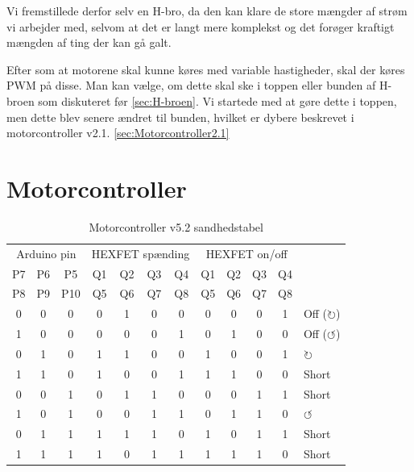 \documentclass[a4paper,oneside,article,danish,table]{memoir}
\begin{document}
Vi fremstillede derfor selv en H-bro, da den kan klare de store mængder af strøm vi arbejder med, selvom at det er langt mere komplekst og det forøger kraftigt mængden af ting der kan gå galt.

Efter som at motorene skal kunne køres med variable hastigheder, skal der køres PWM på disse. Man kan vælge, om dette skal ske i toppen eller bunden af H-broen som diskuteret før \ref{sec:H-broen}. Vi startede med at gøre dette i toppen, men dette blev senere ændret til bunden, hvilket er dybere beskrevet i motorcontroller v2.1. \ref{sec:Motorcontroller2.1}
\section{Motorcontroller}

\begin{table}[htbp]
  \caption{Motorcontroller v5.2 sandhedstabel}
  \centering
  \begin{tabular}{ccc|cccc|ccccl}
    \toprule
    \multicolumn{3}{c}{Arduino pin}&\multicolumn{4}{c}{HEXFET spænding}&\multicolumn{4}{c}{HEXFET on/off}\\
    P7&P6&P5 &Q1&Q2&Q3&Q4 &Q1&Q2&Q3&Q4\\
    P8&P9&P10 &Q5&Q6&Q7&Q8 &Q5&Q6&Q7&Q8\\
    \midrule
    0&0&0 &0&1&0&0 &0&0&0&1 & Off ($\circlearrowright$)\\
    1&0&0 &0&0&0&1 &0&1&0&0 & Off ($\circlearrowleft$)\\
    0&1&0 &1&1&0&0 &1&0&0&1 & $\circlearrowright$\\
    1&1&0 &1&0&0&1 &1&1&0&0 & Short\\
    0&0&1 &0&1&1&0 &0&0&1&1 & Short\\
    1&0&1 &0&0&1&1 &0&1&1&0 & $\circlearrowleft$\\
    0&1&1 &1&1&1&0 &1&0&1&1 & Short\\
    1&1&1 &1&0&1&1 &1&1&1&0 & Short\\
    \bottomrule
  \end{tabular}
  \label{tab:sandhed}
\end{table}
\end{document}
